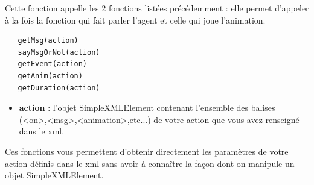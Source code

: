 \documentclass[11pt,dvipsnames,svgnames]{report}
\begin{document}
   Cette fonction appelle les 2 fonctions listées précédemment : elle permet d'appeler à la fois la fonction qui fait parler l'agent et celle qui joue l'animation. \\
   \bigskip
   \begin{lstlisting}
   getMsg(action)
   sayMsgOrNot(action)
   getEvent(action)
   getAnim(action)
   getDuration(action)
   \end{lstlisting}
   \begin{itemize}
   \item \textbf{action} : l'objet SimpleXMLElement contenant l'ensemble des balises\\
    (<on>,<msg>,<animation>,etc...) de votre action que vous avez renseigné dans le xml.\\
   \end{itemize}
   Ces fonctions vous permettent d'obtenir directement les paramètres de votre action définis dans le xml sans avoir à connaître la façon dont on manipule un objet SimpleXMLElement.
\end{document}
